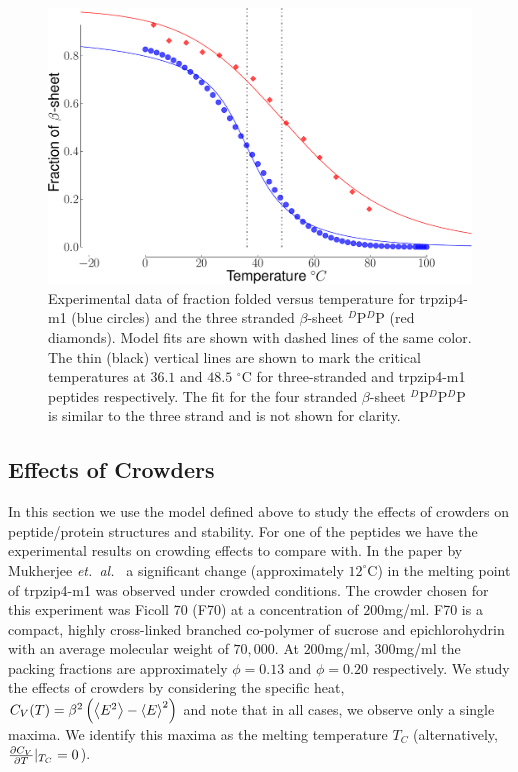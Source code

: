 \begin{figure}[ht]
 \includegraphics[width=\figurewidthSINGLE]{tex/WL_crowding_paper/PLOT_all_experimental_fits-crop.pdf}
 \caption{Experimental data of fraction folded versus temperature for trpzip4-m1 (blue circles) and the three stranded $\beta$-sheet $^D$P$^D$P (red diamonds). Model fits are shown with dashed lines of the same color. The thin (black) vertical lines are shown to mark the critical temperatures at $36.1$ and $48.5$ $^\circ$C for three-stranded and trpzip4-m1 peptides respectively. The fit for the four stranded $\beta$-sheet $^D$P$^D$P$^D$P is similar to the three strand and is not shown for clarity.}
  \label{fig:Exp_fits}
\end{figure}

\subsection{Effects of Crowders}
In this section we use the model defined above to study the effects of crowders on peptide/protein structures and stability. For one of the peptides we have the experimental results on crowding effects to compare with. In the paper by Mukherjee \textit{et.\ al.\ }\cite{mukherjee_effect_2009} a significant change (approximately $12 ^\circ$C) in the melting point of trpzip4-m1 was observed  under crowded conditions. The crowder chosen for this experiment was Ficoll 70 (F70) at a concentration of $200$mg/ml. F70 is a compact, highly cross-linked branched co-polymer of sucrose and epichlorohydrin\cite{venturoli_ficoll_2005} with an average molecular weight of $70,000$. At $200$mg/ml, $300$mg/ml the packing fractions are approximately $\phi=0.13$ and $\phi=0.20$ respectively.\cite{lavrenko_separation_1987,dhar_structure_2010} We study the effects of crowders by considering the specific heat, $C_V(T) = \beta^2 \left(  \left<  E^2  \right> - \left< E \right>^2 \right)$ and note that in all cases, we observe only a single maxima. We identify this maxima as the melting temperature $T_C$ (alternatively, $\frac{\partial C_V}{\partial T} | _ {T_C} = 0$). 

